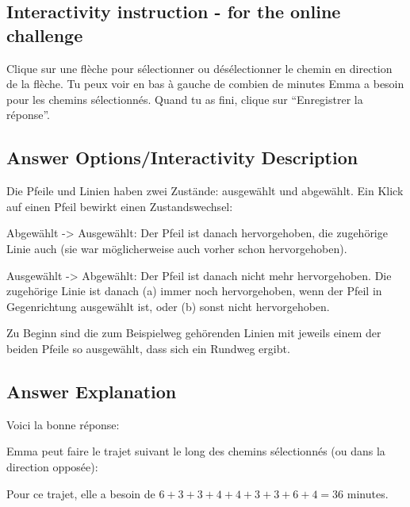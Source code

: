 \documentclass[a4paper,11pt]{report}
\newcommand{\taskGraphicsFolder}{..}
\begin{document}
\subsection*{Interactivity instruction - for the online challenge}

Clique sur une flèche pour sélectionner ou désélectionner le chemin en direction de la flèche. Tu peux voir en bas à gauche de combien de minutes Emma a besoin pour les chemins sélectionnés. Quand tu as fini, clique sur “Enregistrer la réponse”.

\begingroup
\renewcommand{\arraystretch}{1.5}
\subsection*{Answer Options/Interactivity Description}

Die Pfeile und Linien haben zwei Zustände: ausgewählt und abgewählt.
Ein Klick auf einen Pfeil bewirkt einen Zustandswechsel:

Abgewählt -> Ausgewählt:
Der Pfeil ist danach hervorgehoben, die zugehörige Linie auch (sie war möglicherweise auch vorher schon hervorgehoben).

Ausgewählt -> Abgewählt:
Der Pfeil ist danach nicht mehr hervorgehoben.  Die zugehörige Linie ist danach (a) immer noch hervorgehoben, wenn der Pfeil in Gegenrichtung ausgewählt ist, oder (b) sonst nicht hervorgehoben.

Zu Beginn sind die zum Beispielweg gehörenden Linien mit jeweils einem der beiden Pfeile so ausgewählt, dass sich ein Rundweg ergibt.

\endgroup

\subsection*{Answer Explanation}

Voici la bonne réponse:

{\centering%
\par}

Emma peut faire le trajet suivant le long des chemins sélectionnés (ou dans la direction opposée):

{\centering%
\par}

Pour ce trajet, elle a besoin de ${6 + 3 + 3 + 4 + 4 + 3 + 3 + 6 + 4 = 36}$ minutes.
\end{document}
